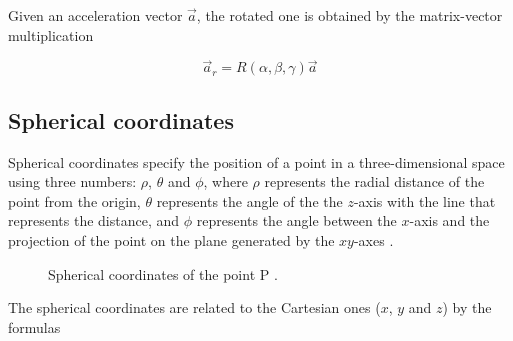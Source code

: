 Given an acceleration vector $\vec a$, the rotated one is obtained by the matrix-vector multiplication

\[
	\vec a_r = R(\alpha, \beta, \gamma) \vec a
\]

\subsection{Spherical coordinates}
Spherical coordinates specify the position of a point in a three-dimensional space using three numbers: $\rho$, $\theta$ and $\phi$, where $\rho$ represents the radial distance of the point from the origin, $\theta$ represents the angle of the the $z$-axis with the line that represents the distance, and $\phi$ represents the angle between the $x$-axis and the projection of the point on the plane generated by the $xy$-axes \cite{Sok}.

\begin{center}
	\begin{figure}[ht!]
		\caption{Spherical coordinates of the point P \cite{HartleySpherical}.}
	\end{figure}
\end{center}
The spherical coordinates are related to the Cartesian ones ($x$, $y$ and $z$) by the formulas \cite{Sok}

